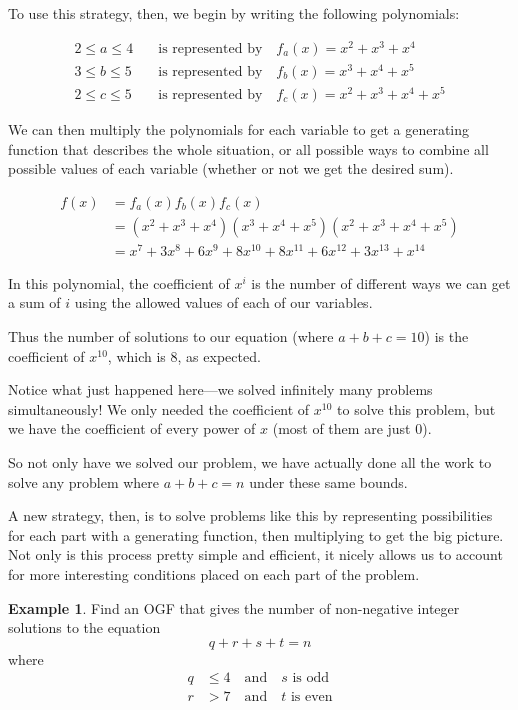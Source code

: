 \documentclass{article}
\theoremstyle{definition}
\newtheorem{example}{Example}
\begin{document}
To use this strategy, then, we begin by writing the following polynomials:

\begin{align}
2 \leq a \leq 4 \quad &\text{is represented by} \quad f_{a}(x)=x^{2}+x^{3}+x^{4} \\
3 \leq b \leq 5 \quad &\text{is represented by} \quad f_{b}(x)=x^{3}+x^{4}+x^{5} \\
2 \leq c \leq 5 \quad &\text{is represented by} \quad f_{c}(x)=x^{2}+x^{3}+x^{4}+x^{5}
\end{align}

We can then multiply the polynomials for each variable to get a generating function that describes the whole situation, or all possible ways to combine all possible values of each variable (whether or not we get the desired sum).

\begin{align}
f(x) &= f_{a}(x) f_{b}(x) f_{c}(x) \\
&= \left(x^{2}+x^{3}+x^{4}\right)\left(x^{3}+x^{4}+x^{5}\right)\left(x^{2}+x^{3}+x^{4}+x^{5}\right) \\
&= x^{7}+3 x^{8}+6 x^{9}+8 x^{10}+8 x^{11}+6 x^{12}+3 x^{13}+x^{14}
\end{align}

In this polynomial, the coefficient of $x^{i}$ is the number of different ways we can get a sum of $i$ using the allowed values of each of our variables.

Thus the number of solutions to our equation (where $a+b+c=10$) is the coefficient of $x^{10}$, which is 8, as expected.

Notice what just happened here---we solved infinitely many problems simultaneously! We only needed the coefficient of $x^{10}$ to solve this problem, but we have the coefficient of every power of $x$ (most of them are just 0).

So not only have we solved our problem, we have actually done all the work to solve any problem where $a+b+c=n$ under these same bounds.

A new strategy, then, is to solve problems like this by representing possibilities for each part with a generating function, then multiplying to get the big picture. Not only is this process pretty simple and efficient, it nicely allows us to account for more interesting conditions placed on each part of the problem.

\begin{example}
Find an OGF that gives the number of non-negative integer solutions to the equation
\[q+r+s+t=n\]
where
\begin{align}
q &\leq 4 \quad \text{and} \quad s \text{ is odd} \\
r &> 7 \quad \text{and} \quad t \text{ is even}
\end{align}
\end{example}
\end{document}
